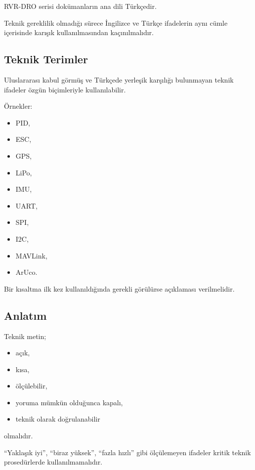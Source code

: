 \documentclass[11pt,a4paper]{article}
\begin{document}
RVR-DRO serisi dokümanların ana dili Türkçedir.

Teknik gereklilik olmadığı sürece İngilizce ve Türkçe ifadelerin
aynı cümle içerisinde karışık kullanılmasından kaçınılmalıdır.



\subsection{Teknik Terimler}

Uluslararası kabul görmüş ve Türkçede yerleşik karşılığı bulunmayan
teknik ifadeler özgün biçimleriyle kullanılabilir.

Örnekler:

\begin{itemize}
    \item PID,
    \item ESC,
    \item GPS,
    \item LiPo,
    \item IMU,
    \item UART,
    \item SPI,
    \item I2C,
    \item MAVLink,
    \item ArUco.
\end{itemize}

Bir kısaltma ilk kez kullanıldığında gerekli görülürse açıklaması
verilmelidir.

\subsection{Anlatım}

Teknik metin;

\begin{itemize}
    \item açık,
    \item kısa,
    \item ölçülebilir,
    \item yoruma mümkün olduğunca kapalı,
    \item teknik olarak doğrulanabilir
\end{itemize}

olmalıdır.

\begin{dikkatkutusu}
``Yaklaşık iyi'', ``biraz yüksek'', ``fazla hızlı'' gibi ölçülemeyen
ifadeler kritik teknik prosedürlerde kullanılmamalıdır.
\end{dikkatkutusu}
\end{document}
